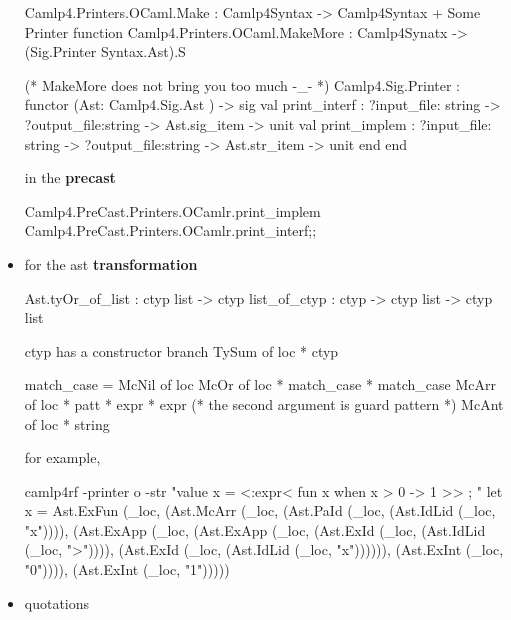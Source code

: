 \begin{itemize}
\begin{bluecode}
Camlp4.Printers.OCaml.Make :
 Camlp4Syntax ->  Camlp4Syntax + Some Printer function
Camlp4.Printers.OCaml.MakeMore :
 Camlp4Synatx -> (Sig.Printer Syntax.Ast).S

(* MakeMore does not bring you too much -_- *)
Camlp4.Sig.Printer :
  functor (Ast: Camlp4.Sig.Ast ) ->
    sig
      val print_interf :
        ?input_file: string -> ?output_file:string -> Ast.sig_item -> unit 
      val print_implem :
        ?input_file: string -> ?output_file:string -> Ast.str_item -> unit          end 
  end

\end{bluecode}


  in the {\bf precast}
  

\begin{bluecode}
Camlp4.PreCast.Printers.OCamlr.print_implem
Camlp4.PreCast.Printers.OCamlr.print_interf;;
\end{bluecode}


\item for the ast {\bf transformation }


\begin{bluecode}
Ast.tyOr_of_list : ctyp list -> ctyp
list_of_ctyp : ctyp -> ctyp list -> ctyp list
\end{bluecode}


  ctyp has a constructor branch   TySum of loc * ctyp


\begin{bluecode}
match_case =
  McNil of loc
  McOr of loc * match_case * match_case
  McArr  of loc * patt * expr * expr (* the second argument is guard pattern *)
  McAnt of loc * string 
\end{bluecode}


for example,


\begin{bluecode}
camlp4rf -printer o -str "value x = <:expr< fun x when x > 0 -> 1 >> ; "
let x =
  Ast.ExFun (_loc,
    (Ast.McArr (_loc, (Ast.PaId (_loc, (Ast.IdLid (_loc, "x")))),
       (Ast.ExApp (_loc,
          (Ast.ExApp (_loc, (Ast.ExId (_loc, (Ast.IdLid (_loc, ">")))),
             (Ast.ExId (_loc, (Ast.IdLid (_loc, "x")))))),
          (Ast.ExInt (_loc, "0")))),
       (Ast.ExInt (_loc, "1")))))
  
\end{bluecode}


     
\item quotations



\end{itemize}
